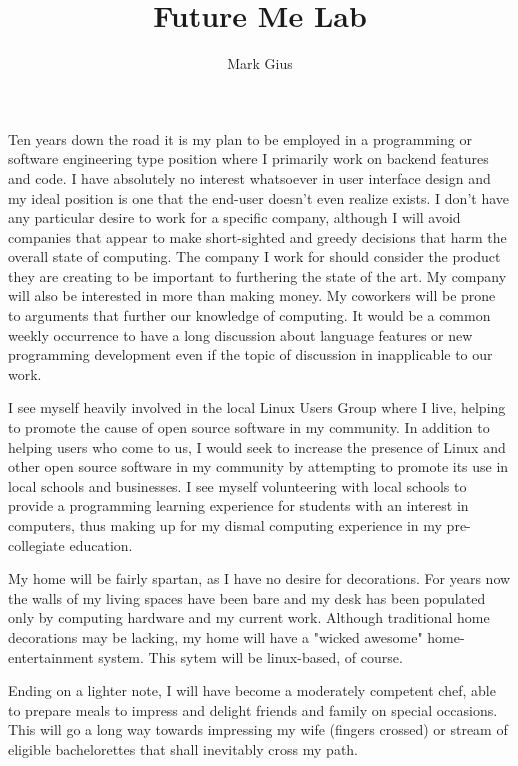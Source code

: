 \documentclass[12pt]{article}
\begin{document}
\author{Mark Gius}
\title{Future Me Lab}
\maketitle
\newpage
%
%
%
%
\doublespacing

Ten years down the road it is my plan to be employed in a programming or software engineering type position where I primarily work on backend features and code.  I have absolutely no interest whatsoever in user interface design and my ideal position is one that the end-user doesn't even realize exists.  I don't have any particular desire to work for a specific company, although I will avoid companies that appear to make short-sighted and greedy decisions that harm the overall state of computing.  The company I work for should consider the product they are creating to be important to furthering the state of the art.  My company will also be interested in more than making money.  My coworkers will be prone to arguments that further our knowledge of computing.  It would be a common weekly occurrence to have a long discussion about language features or new programming development even if the topic of discussion in inapplicable to our work.  

I see myself heavily involved in the local Linux Users Group where I live, helping to promote the cause of open source software in my community.  In addition to helping users who come to us, I would seek to increase the presence of Linux and other open source software in my community by attempting to promote its use in local schools and businesses.  I see myself volunteering with local schools to provide a programming learning experience for students with an interest in computers, thus making up for my dismal computing experience in my pre-collegiate education.

My home will be fairly spartan, as I have no desire for decorations.  For years now the walls of my living spaces have been bare and my desk has been populated only by computing hardware and my current work.  Although traditional home decorations may be lacking, my home will have a "wicked awesome" home-entertainment system.  This sytem will be linux-based, of course. 

Ending on a lighter note, I will have become a moderately competent chef, able to prepare meals to impress and delight friends and family on special occasions.  This will go a long way towards impressing my wife (fingers crossed) or stream of eligible bachelorettes that shall inevitably cross my path. 
\end{document}

